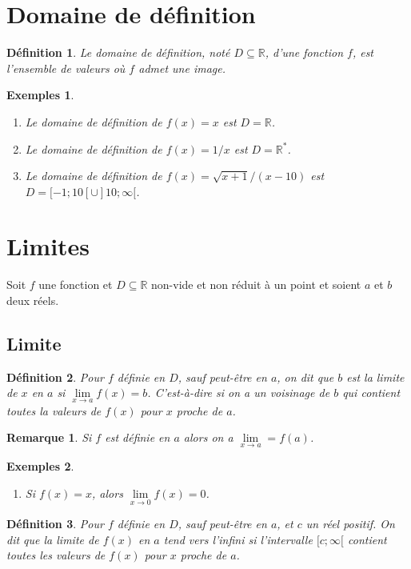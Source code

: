 \documentclass[a4paper,12pt]{book}
\newcommand{\real}{\mathbb{R}}
\newtheorem{definition}{Définition}
\newtheorem*{exemples}{Exemples}
\newtheorem*{remarque}{Remarque}
\begin{document}
\section{Domaine de définition}
\noindent
\begin{definition}
 Le domaine de définition, noté $D\subseteq\real$, d'une fonction $f$, est l'ensemble
de valeurs où $f$ admet une image.
\end{definition}

\begin{exemples}\hfill\break
\begin{enumerate}
\item Le domaine de définition de $f(x)=x$ est $D=\real$.
\item Le domaine de définition de $f(x)=1/x$ est $D=\real^\ast$.
\item Le domaine de définition de $f(x)=\sqrt{x+1}/(x-10)$ est $D=[-1;10[\cup]10;\infty[$.
\end{enumerate}
\end{exemples}


\section{Limites}

Soit $f$ une fonction et $D\subseteq\real$ non-vide et non réduit à un point et soient $a$ et $b$ deux réels. 
\subsection{Limite}
\begin{definition}
Pour $f$ définie en $D$, sauf peut-être en $a$, on dit que $b$ est la
limite de $x$ en $a$ si $\lim\limits_{x\rightarrow a}f(x)=b$. C'est-à-dire si on a un
voisinage de $b$ qui contient toutes la valeurs de $f(x)$ pour $x$ proche de $a$.
\end{definition}

\begin{remarque}
Si $f$ est définie en $a$ alors on a $\lim\limits_{x\rightarrow a}=f(a)$.
\end{remarque}

\begin{exemples}
\begin{enumerate}
\item Si $f(x)=x$, alors $\lim\limits_{x\rightarrow 0}f(x)=0$.
\end{enumerate}
\end{exemples}

\begin{definition}
Pour $f$ définie en $D$, sauf peut-être en $a$, et $c$ un réel positif. 
On dit que la limite de $f(x)$ en $a$ tend vers l'infini si
l'intervalle $[c;\infty[$ contient toutes les valeurs de $f(x)$ pour $x$ proche de $a$.
\end{definition}
\end{document}
